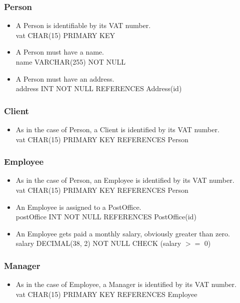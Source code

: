 \documentclass{report}[a4paper]
\theoremstyle{remark}
\begin{document}
\subsubsection{Person}
\begin{itemize}
    \item A Person is identifiable by its VAT number. \\ vat CHAR(15) PRIMARY KEY
    \item A Person must have a name. \\ name VARCHAR(255) NOT NULL
    \item A Person must have an address. \\ address INT NOT NULL REFERENCES Address(id)
\end{itemize}
\subsubsection{Client}
\begin{itemize}
    \item As in the case of Person, a Client is identified by its VAT number. \\ vat CHAR(15) PRIMARY KEY REFERENCES Person
\end{itemize}
\subsubsection{Employee}
\begin{itemize}
    \item As in the case of Person, an Employee is identified by its VAT number. \\ vat CHAR(15) PRIMARY KEY REFERENCES Person
    \item An Employee is assigned to a PostOffice. \\ postOffice INT NOT NULL REFERENCES PostOffice(id)
    \item An Employee gets paid a monthly salary, obviously greater than zero. \\ salary DECIMAL(38, 2) NOT NULL CHECK (salary $>=$ 0)
\end{itemize}
\subsubsection{Manager}
\begin{itemize}
    \item As in the case of Employee, a Manager is identified by its VAT number. \\ vat CHAR(15) PRIMARY KEY REFERENCES Employee
\end{itemize}
\end{document}
